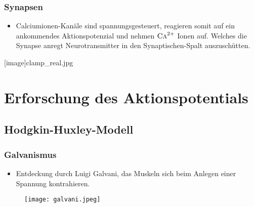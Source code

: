 \documentclass[ngerman]{beamer}
\begin{document}
\begin{frame}\frametitle{ Synapsen }


\begin{itemize}
	\item Calciumionen-Kanäle sind spannungsgesteuert, reagieren somit auf ein ankommendes Aktionspotenzial und nehmen $ \textsc{Ca}^{2+} $ Ionen auf. Welches die Synapse anregt Neurotransmitter in den Synaptischen-Spalt auszuschütten.
\end{itemize}

\end{frame}

[image]{clamp_real.jpg}
\section{Erforschung des Aktionspotentials}
\subsection{Hodgkin-Huxley-Modell}

\begin{frame}\frametitle{ Galvanismus }

\begin{itemize}
	\item Entdeckung durch Luigi Galvani, das Muskeln sich beim Anlegen einer Spannung kontrahieren.	
\end{itemize}	

\begin{figure}[h]
	\centering
	\texttt{[image: galvani.jpeg]}
\end{figure}
	
\end{frame}
\end{document}
